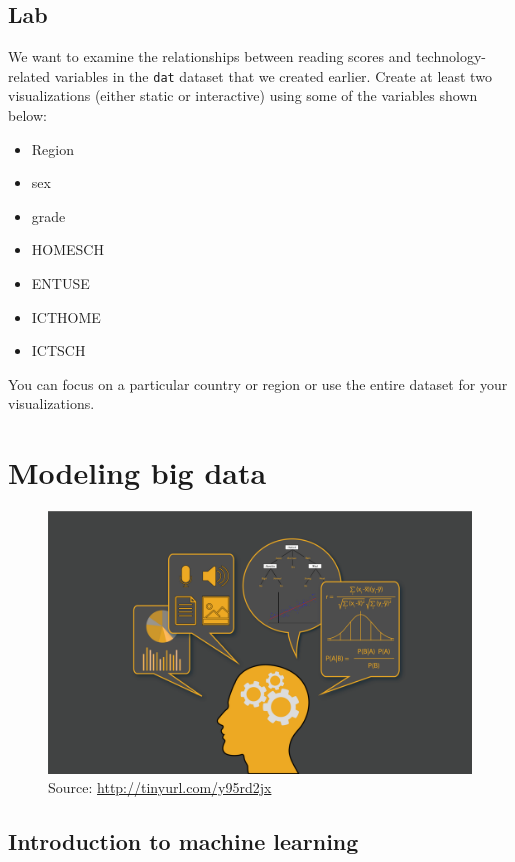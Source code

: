 \documentclass[]{book}
\providecommand{\tightlist}{%
  \setlength{\itemsep}{0pt}\setlength{\parskip}{0pt}}
\begin{document}
\hypertarget{lab-1}{%
\section{Lab}\label{lab-1}}

We want to examine the relationships between reading scores and technology-related variables in the \texttt{dat} dataset that we created earlier. Create at least two visualizations (either static or interactive) using some of the variables shown below:

\begin{itemize}
\tightlist
\item
  Region
\item
  sex
\item
  grade
\item
  HOMESCH
\item
  ENTUSE
\item
  ICTHOME
\item
  ICTSCH
\end{itemize}

You can focus on a particular country or region or use the entire dataset for your visualizations.

\hypertarget{modeling-big-data}{%
\chapter{Modeling big data}\label{modeling-big-data}}

\begin{figure}
\centering
\includegraphics{images/machine_learning.png}
\caption{Source: \url{http://tinyurl.com/y95rd2jx}}
\end{figure}

\hypertarget{introduction-to-machine-learning}{%
\section{Introduction to machine learning}\label{introduction-to-machine-learning}}
\end{document}
